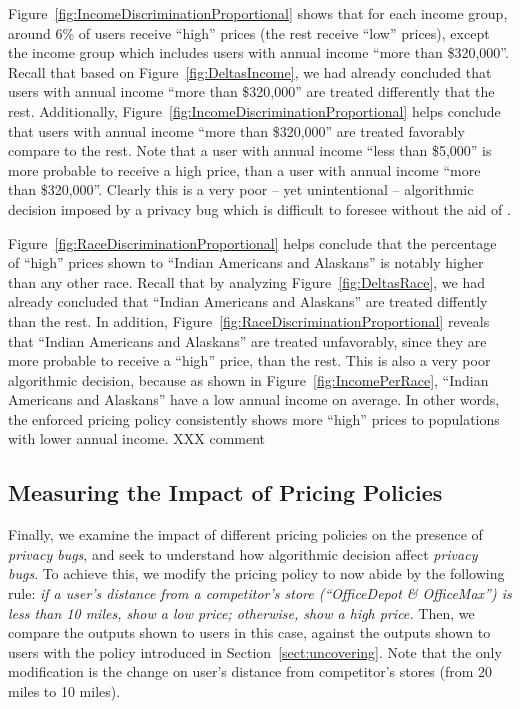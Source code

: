 Figure~\ref{fig:IncomeDiscriminationProportional} shows that for each income
group, around 6\% of users receive ``high'' prices (the rest receive ``low''
prices), except the income group which includes users with annual income
``more than \$320,000''. Recall that based on Figure~\ref{fig:DeltasIncome}, we
had already concluded that users with annual income ``more than \$320,000'' are
treated differently that the rest. Additionally,
Figure~\ref{fig:IncomeDiscriminationProportional} helps conclude that users with
annual income ``more than \$320,000'' are treated favorably compare to the rest.
Note that a user with annual income ``less than \$5,000'' is more probable to
receive a high price, than a user with annual income ``more than \$320,000''.
Clearly this is a very poor -- yet unintentional -- algorithmic decision imposed
by a privacy bug which is difficult to foresee without the aid of \sysname.


Figure~\ref{fig:RaceDiscriminationProportional} helps conclude that the
percentage of ``high'' prices shown to ``Indian Americans and Alaskans'' is
notably higher than any other race. Recall that by analyzing
Figure~\ref{fig:DeltasRace}, we had already concluded that
``Indian Americans and Alaskans'' are treated diffently than the rest.
In addition, Figure~\ref{fig:RaceDiscriminationProportional} reveals that
``Indian Americans and Alaskans'' are treated unfavorably, since they are
more probable to receive a ``high'' price, than the rest. This is also a very
poor algorithmic decision, because as shown in Figure~\ref{fig:IncomePerRace},
``Indian Americans and Alaskans'' have a low annual income on average. In
other words, the enforced pricing policy consistently shows more
``high'' prices to populations with lower annual income.
XXX comment

\subsection{\normalsize Measuring the Impact of Pricing Policies}
Finally, we examine the impact of different pricing policies on the presence
of {\em privacy bugs}, and seek to understand how algorithmic decision
affect {\em privacy bugs}. To achieve this, we modify the pricing policy
to now abide by the following rule: {\it if a user's distance from a
competitor's store (``OfficeDepot \& OfficeMax'') is less than 10 miles,
show a low price; otherwise, show a high price.} Then, we compare the outputs
shown to users in this case, against the outputs shown to users with the policy
introduced in Section~\ref{sect:uncovering}. Note that the only modification 
is the change on user's distance from competitor's stores (from 20 miles
to 10 miles).

